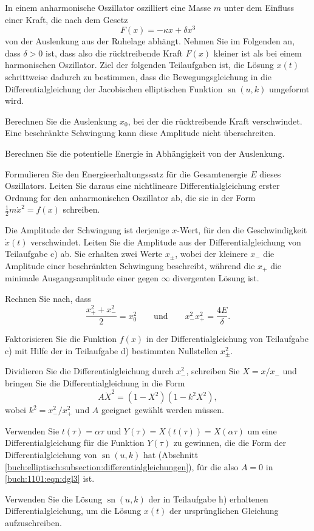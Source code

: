 \label{buch:elliptisch:aufgabe:1}
In einem anharmonische Oszillator oszilliert eine Masse $m$ unter dem
Einfluss einer Kraft, die nach dem Gesetz
\[
F(x) = -\kappa x + \delta x^3
\]
von der Auslenkung aus der Ruhelage abhängt.
Nehmen Sie im Folgenden an, dass $\delta >0$ ist,
dass also die rücktreibende Kraft $F(x)$ kleiner ist als bei einem
harmonischen Oszillator.
Ziel der folgenden Teilaufgaben ist, die Lösung $x(t)$ schrittweise
dadurch zu bestimmen, dass die Bewegungsgleichung in die Differentialgleichung
der Jacobischen elliptischen Funktion $\operatorname{sn}(u,k)$ umgeformt
wird.
\begin{teilaufgaben}
\item
Berechnen Sie die Auslenkung $x_0$, bei der die rücktreibende Kraft
verschwindet.
Eine beschränkte Schwingung kann diese Amplitude nicht überschreiten.
\item
Berechnen Sie die potentielle Energie in Abhängigkeit von der 
Auslenkung.
\item
\label{buch:1101:basic-dgl}
Formulieren Sie den Energieerhaltungssatz für die Gesamtenergie $E$
dieses Oszillators.
Leiten Sie daraus eine nichtlineare Differentialgleichung erster Ordnung
for den anharmonischen Oszillator ab, die sie in der Form
$\frac12m\dot{x}^2 = f(x)$ schreiben.
\item
Die Amplitude der Schwingung ist derjenige $x$-Wert, für den die
Geschwindigkeit $\dot{x}(t)$ verschwindet.
Leiten Sie die Amplitude aus der Differentialgleichung von
Teilaufgabe c)
ab.
Sie erhalten zwei Werte $x_{\pm}$, wobei der kleinere $x_-$
die Amplitude einer beschränkten Schwingung beschreibt,
während die $x_+$ die minimale Ausgangsamplitude einer gegen
$\infty$ divergenten Lösung ist.
\item
Rechnen Sie nach, dass
\[
\frac{x_+^2+x_-^2}{2}
=
x_0^2
\qquad\text{und}\qquad
x_-^2x_+^2
=
\frac{4E}{\delta}.
\]
\item
Faktorisieren Sie die Funktion $f(x)$ in der Differentialgleichung
von Teilaufgabe c) mit Hilfe der in Teilaufgabe d) bestimmten 
Nullstellen $x_{\pm}^2$.
\item
Dividieren Sie die Differentialgleichung durch $x_-^2$, schreiben
Sie $X=x/x_-$ und bringen Sie die Differentialgleichung in die
Form
\begin{equation}
A \dot{X}^2
=
(1-X^2)
(1-k^2X^2),
\label{buch:1101:eqn:dgl3}
\end{equation}
wobei $k^2=x_-^2/x_+^2$ und $A$ geeignet gewählt werden müssen.
\item
\label{buch:1101:teilaufgabe:dgl3}
Verwenden Sie $t(\tau) = \alpha\tau$
und
$Y(\tau)=X(t(\tau))=X(\alpha\tau)$ um eine Differentialgleichung für
die Funktion $Y(\tau)$ zu gewinnen, die die Form der Differentialgleichung
von $\operatorname{sn}(u,k)$ hat (Abschnitt 
\ref{buch:elliptisch:subsection:differentialgleichungen}),
für die also $A=0$ in \eqref{buch:1101:eqn:dgl3} ist.
\item
Verwenden Sie die Lösung $\operatorname{sn}(u,k)$ der in 
Teilaufgabe h)
erhaltenen Differentialgleichung,
um die Lösung $x(t)$ der ursprünglichen Gleichung aufzuschreiben.
\end{teilaufgaben}


